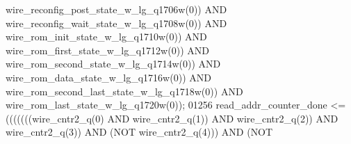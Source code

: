 \begin{DoxyCode}
{{      wire_reconfig_post_state_w_lg_q1706w}\textcolor{vhdlchar}{(}\textcolor{vhdllogic}{}\textcolor{vhdllogic}{0}\textcolor{vhdlchar}{)}\textcolor{vhdlchar}{)} \textcolor{keywordflow}{AND} \textcolor{vhdlchar}{
      wire_reconfig_wait_state_w_lg_q1708w}\textcolor{vhdlchar}{(}\textcolor{vhdllogic}{}\textcolor{vhdllogic}{0}\textcolor{vhdlchar}{)}\textcolor{vhdlchar}{)} \textcolor{keywordflow}{AND} \textcolor{vhdlchar}{wire_rom_init_state_w_lg_q1710w}\textcolor{vhdlchar}{(}\textcolor{vhdllogic}{}\textcolor{vhdllogic}{0}\textcolor{vhdlchar}{)}\textcolor{vhdlchar}{)} \textcolor{keywordflow}{AND} \textcolor{vhdlchar}{
      wire_rom_first_state_w_lg_q1712w}\textcolor{vhdlchar}{(}\textcolor{vhdllogic}{}\textcolor{vhdllogic}{0}\textcolor{vhdlchar}{)}\textcolor{vhdlchar}{)} \textcolor{keywordflow}{AND} \textcolor{vhdlchar}{wire_rom_second_state_w_lg_q1714w}\textcolor{vhdlchar}{(}\textcolor{vhdllogic}{}\textcolor{vhdllogic}{0}\textcolor{vhdlchar}{)}\textcolor{vhdlchar}{)} \textcolor{keywordflow}{AND} \textcolor{vhdlchar}{
      wire_rom_data_state_w_lg_q1716w}\textcolor{vhdlchar}{(}\textcolor{vhdllogic}{}\textcolor{vhdllogic}{0}\textcolor{vhdlchar}{)}\textcolor{vhdlchar}{)} \textcolor{keywordflow}{AND} \textcolor{vhdlchar}{wire_rom_second_last_state_w_lg_q1718w}\textcolor{vhdlchar}{(}\textcolor{vhdllogic}{}\textcolor{vhdllogic}{0}\textcolor{vhdlchar}{)}\textcolor{vhdlchar}{)} \textcolor{keywordflow}{AND} \textcolor{vhdlchar}{
      wire_rom_last_state_w_lg_q1720w}\textcolor{vhdlchar}{(}\textcolor{vhdllogic}{}\textcolor{vhdllogic}{0}\textcolor{vhdlchar}{)}\textcolor{vhdlchar}{)};
01256     \textcolor{vhdlchar}{read_addr_counter_done} \textcolor{vhdlchar}{<=} \textcolor{vhdlchar}{(}\textcolor{vhdlchar}{(}\textcolor{vhdlchar}{(}\textcolor{vhdlchar}{(}\textcolor{vhdlchar}{(}\textcolor{vhdlchar}{(}\textcolor{vhdlchar}{(}\textcolor{vhdlchar}{wire_cntr2_q}\textcolor{vhdlchar}{(}\textcolor{vhdllogic}{}\textcolor{vhdllogic}{0}\textcolor{vhdlchar}{)} \textcolor{keywordflow}{AND} \textcolor{vhdlchar}{wire_cntr2_q}\textcolor{vhdlchar}{(}\textcolor{vhdllogic}{}\textcolor{vhdllogic}{1}\textcolor{vhdlchar}{)}\textcolor{vhdlchar}{)} \textcolor{keywordflow}{AND} \textcolor{vhdlchar}{
      wire_cntr2_q}\textcolor{vhdlchar}{(}\textcolor{vhdllogic}{}\textcolor{vhdllogic}{2}\textcolor{vhdlchar}{)}\textcolor{vhdlchar}{)} \textcolor{keywordflow}{AND} \textcolor{vhdlchar}{wire_cntr2_q}\textcolor{vhdlchar}{(}\textcolor{vhdllogic}{}\textcolor{vhdllogic}{3}\textcolor{vhdlchar}{)}\textcolor{vhdlchar}{)} \textcolor{keywordflow}{AND} \textcolor{vhdlchar}{(}\textcolor{keywordflow}{NOT} \textcolor{vhdlchar}{wire_cntr2_q}\textcolor{vhdlchar}{(}\textcolor{vhdllogic}{}\textcolor{vhdllogic}{4}\textcolor{vhdlchar}{)}\textcolor{vhdlchar}{)}\textcolor{vhdlchar}{)} \textcolor{keywordflow}{AND} \textcolor{vhdlchar}{(}\textcolor{keywordflow}{NOT} \textcolor{vhdlchar}{
}}
\end{DoxyCode}
